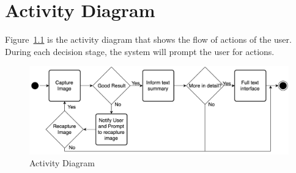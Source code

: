 \chapter{Activity Diagram}
Figure~\ref{activityDiagram} is the activity diagram that shows the flow of actions of the user.
During each decision stage, the system will prompt the user for actions.


\begin{figure}
	\label{activityDiagram}
	\centering
    \includegraphics[scale = 0.26]{Activity_H.png}%
    
    \caption{Activity Diagram}
\end{figure}